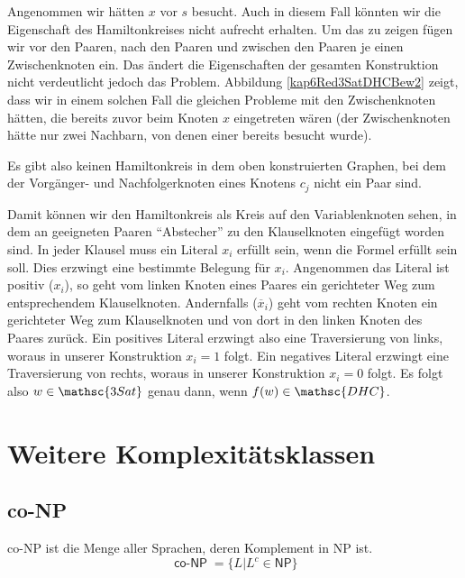 \begin{Bew}
  Angenommen wir hätten $x$ vor $s$ besucht. Auch in diesem Fall könnten wir die Eigenschaft des Hamiltonkreises nicht aufrecht erhalten. Um das zu zeigen fügen wir vor den Paaren, nach den Paaren und zwischen den Paaren je einen Zwischenknoten ein. Das ändert die Eigenschaften der gesamten Konstruktion nicht verdeutlicht jedoch das Problem. Abbildung \vref{kap6Red3SatDHCBew2} zeigt, dass wir in einem solchen Fall die gleichen Probleme mit den Zwischenknoten hätten, die bereits zuvor beim Knoten $x$ eingetreten wären (der Zwischenknoten hätte nur zwei Nachbarn, von denen einer bereits besucht wurde).
  
  Es gibt also keinen Hamiltonkreis in dem oben konstruierten Graphen, bei dem der Vorgänger- und Nachfolgerknoten eines Knotens $c_j$ nicht ein Paar sind.
  
  Damit können wir den Hamiltonkreis als Kreis auf den Variablenknoten sehen, in dem an geeigneten Paaren "`Abstecher"' zu den Klauselknoten eingefügt worden sind. In jeder Klausel muss ein Literal $x_i$ erfüllt sein, wenn die Formel erfüllt sein soll. Dies erzwingt eine bestimmte Belegung für $x_i$. Angenommen das Literal ist positiv ($x_i$), so geht vom linken Knoten eines Paares ein gerichteter Weg zum entsprechendem Klauselknoten. Andernfalls ($\overline{x}_i$) geht vom rechten Knoten ein gerichteter Weg zum Klauselknoten und von dort in den linken Knoten des Paares zurück. Ein positives Literal erzwingt also eine Traversierung von links, woraus in unserer Konstruktion $x_i=1$ folgt. Ein negatives Literal erzwingt eine Traversierung von rechts, woraus in unserer Konstruktion $x_i=0$ folgt. Es folgt also $w \in \mathsc{3Sat}$ genau dann, wenn $f(w) \in \mathsc{DHC}$.
\end{Bew}



\section{Weitere Komplexitätsklassen}
\subsection{co-NP}
\begin{Def}[\textsf{co-NP}]
  \hspace{\parindent}\textsf{co-NP} ist die Menge aller Sprachen, deren Komplement in \textsf{NP} ist.
  \[ \operatorname{\mathsf{co-NP}} = \{ L | L^c \in \mathsf{NP} \} \]
\end{Def}

